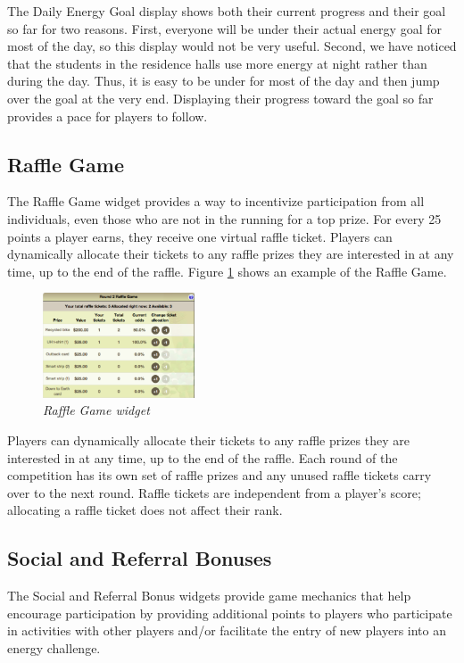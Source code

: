 The Daily Energy Goal display shows both their current progress and their goal so far for two reasons. First, everyone will be under their actual energy goal for most of the day, so this display would not be very useful. Second, we have noticed that the students in the residence halls use more energy at night rather than during the day. Thus, it is easy to be under for most of the day and then jump over the goal at the very end. Displaying their progress toward the goal so far provides a pace for players to follow.

\subsection{Raffle Game}

The Raffle Game widget provides a way to incentivize participation from all individuals, even those who are not in the running for a top prize. For every 25 points a player earns, they receive one virtual raffle ticket. Players can dynamically allocate their tickets to any raffle prizes they are interested in at any time, up to the end of the raffle.  Figure \ref{fig:RaffleGame} shows an example of the Raffle Game. 


\begin{figure}[th]
  \center
  \includegraphics[width=0.4\textwidth]{raffle-small.eps}
  \caption{\em \small Raffle Game widget}
  \label{fig:RaffleGame}
\end{figure}

Players can dynamically allocate their tickets to any raffle prizes they are interested in at any time, up to the end of the raffle. Each round of the competition has its own set of raffle prizes and any unused raffle tickets carry over to the next round. Raffle tickets are independent from a player's score; allocating a raffle ticket does not affect their rank. 

\subsection{Social and Referral Bonuses}

The Social and Referral Bonus widgets provide game mechanics that help encourage participation by providing additional points to players who participate in activities with other players and/or facilitate the entry of new players into an energy challenge.

